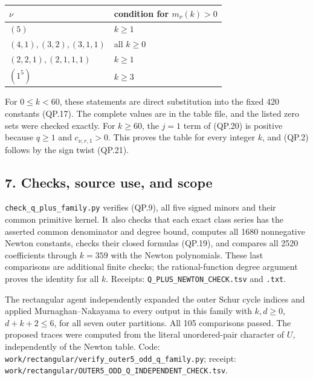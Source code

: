 \documentclass[
  10pt,
]{article}
\begin{document}
\begin{longtable}[]{@{}ll@{}}
\toprule\noalign{}
\(\nu\) & condition for \(m_\nu(k)>0\) \\
\midrule\noalign{}
\endhead
\bottomrule\noalign{}
\endlastfoot
\((5)\) & \(k\ge1\) \\
\((4,1),(3,2),(3,1,1)\) & all \(k\ge0\) \\
\((2,2,1),(2,1,1,1)\) & \(k\ge1\) \\
\((1^5)\) & \(k\ge3\) \\
\end{longtable}

For \(0\le k<60\), these statements are direct substitution into the
fixed 420 constants (QP.17). The complete values are in the table file,
and the listed zero sets were checked exactly. For \(k\ge60\), the
\(j=1\) term of (QP.20) is positive because \(q\ge1\) and
\(c_{\nu,r,1}>0\). This proves the table for every integer \(k\), and
(QP.2) follows by the sign twist (QP.21).

\subsection{7. Checks, source use, and
scope}\label{checks-source-use-and-scope}

\texttt{\small check\_\allowbreak{}q\_\allowbreak{}plus\_\allowbreak{}family.py}
verifies (QP.9), all five signed minors and their common primitive
kernel. It also checks that each exact class series has the asserted
common denominator and degree bound, computes all 1680 nonnegative
Newton constants, checks their closed formulas (QP.19), and compares all
2520 coefficients through \(k=359\) with the Newton polynomials. These
last comparisons are additional finite checks; the rational-function
degree argument proves the identity for all \(k\). Receipts:
\texttt{\small Q\_\allowbreak{}PLUS\_\allowbreak{}NEWTON\_\allowbreak{}CHECK.tsv}
and \texttt{\small .txt}.

The rectangular agent independently expanded the outer Schur cycle
indices and applied Murnaghan--Nakayama to every output in this family
with \(k,d\ge0\), \(d+k+2\le6\), for all seven outer partitions. All 105
comparisons passed. The proposed traces were computed from the literal
unordered-pair character of \(U\), independently of the Newton table.
Code:
\texttt{\small work/\allowbreak{}rectangular/\allowbreak{}verify\_\allowbreak{}outer5\_\allowbreak{}odd\_\allowbreak{}q\_\allowbreak{}family.py};
receipt:
\texttt{\small work/\allowbreak{}rectangular/\allowbreak{}OUTER5\_\allowbreak{}ODD\_\allowbreak{}Q\_\allowbreak{}INDEPENDENT\_\allowbreak{}CHECK.tsv}.
\end{document}
